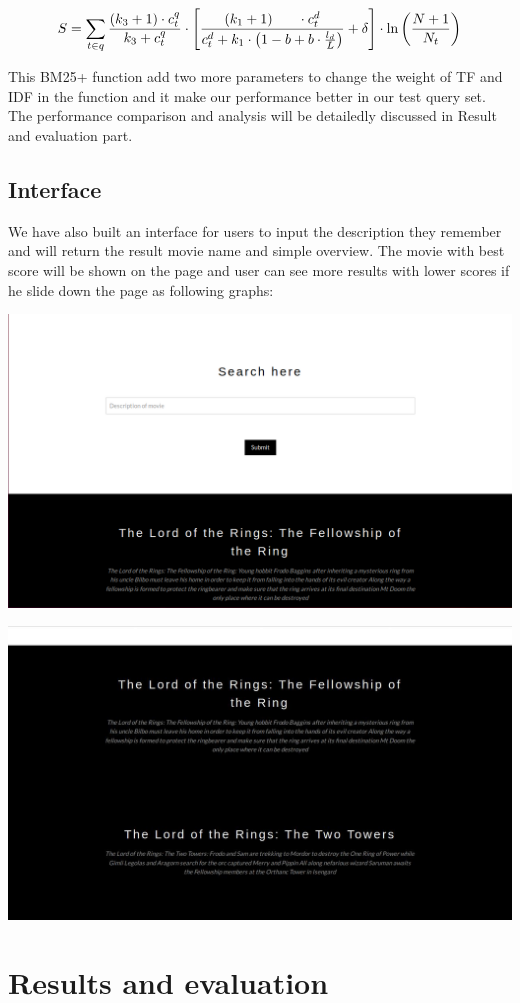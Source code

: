\documentclass[letterpaper,10pt]{article}
\newenvironment{Figure}
  {\par\medskip\noindent\minipage{\linewidth}}
  {\endminipage\par\medskip}
\begin{document}
\begin{multicols}{2}
    {
    \tiny
    $$
        S = \sum_{t \in q} \frac{\left(k_{3}+1\right) \cdot c_{t}^{q}}{k_{3}+c_{t}^{q}} \cdot\left[\frac{\left(k_{1}+1\right) \\ \cdot c_{t}^{d}}{c_{t}^{d}+k_{1} \cdot\left(1-b+b \cdot \frac{l_{d}}{L}\right)}+\delta\right] \cdot \ln \left(\frac{N+1}{N_{t}}\right)
    $$
    }


    This BM25+ function add two more parameters to change the weight of TF and IDF in the function and it make our performance better in our test query set. The performance comparison and analysis will be detailedly discussed in Result and evaluation part.

    \subsection{Interface }

    We have also built an interface for users to input the description they remember and will return the result movie name and simple overview. The movie with best score will be shown on the page and user can see more results with lower scores if he slide down the page as following graphs:
    
    \begin{Figure}
    	\center
  		\includegraphics[width=0.5\linewidth]{interface.jpg}
	\end{Figure}
	
	\begin{Figure}
    	\center
  		\includegraphics[width=0.5\linewidth]{interface1.jpg}
	\end{Figure}

    \section{Results and evaluation}


\end{multicols}
\end{document}
